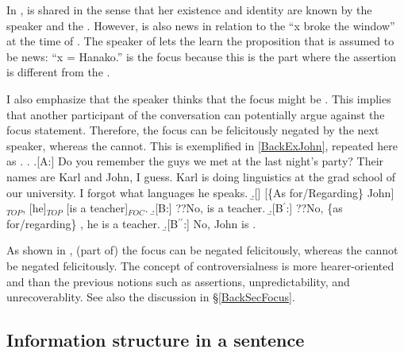In \Last[A],
 is shared in the sense that
her existence and identity are known by the speaker and the .
However,
 is also news in relation to the 
``x broke the window'' at the time of  \Last[Q].
The speaker of \Last[A] lets the  learn the proposition that is assumed to be news: ``x = Hanako.''
 is the focus because
this is the part where the assertion is different from the .

I also emphasize that the speaker thinks that the focus might be .
This implies that another participant of the conversation can potentially argue against the focus statement.
Therefore, the focus can be felicitously negated by the next speaker,
whereas the  cannot.
This is exemplified in \ref{BackExJohn}, repeated here as \Next.
%
\ex. \label{BackExJohn2}\a.[A:] Do you remember the guys we met at the last night's party?
     Their names are Karl and John, I guess.
     Karl is doing linguistics at the grad school of our university.
     I forgot what languages he speaks.
     \b.[] [\{As for/Regarding\} John]$_{TOP}$, [he]$_{TOP}$ [is a teacher]$_{FOC}$.
     \b.[B:] ??No,  is a teacher.
     \b.[B$^{\prime}$:] ??No, \{as for/regarding\} , he is a teacher.
     \b.[B$^{\prime\prime}$:] No, John is .

As shown in \Last,
(part of) the focus  can be negated felicitously,
whereas the   cannot be negated felicitously.
The concept of controversialness is more hearer-oriented and  than the previous notions such as assertions, unpredictability, and unrecoverablity.
See also the discussion in \S \ref{BackSecFocus}.

\subsection{Information structure in a sentence}\label{FrameworkIS}


